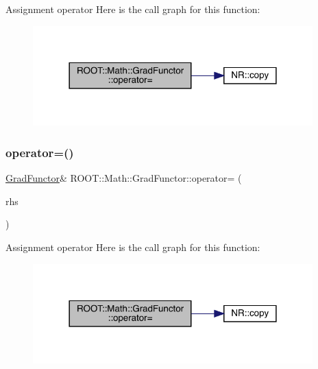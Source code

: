 Assignment operator Here is the call graph for this function\+:
\nopagebreak
\begin{figure}[H]
\begin{center}
\leavevmode
\includegraphics[width=306pt]{de/d74/classROOT_1_1Math_1_1GradFunctor_a7f7a0c6b466d283cb6085f0e57ab1e6a_cgraph}
\end{center}
\end{figure}
\mbox{\label{classROOT_1_1Math_1_1GradFunctor_a7f7a0c6b466d283cb6085f0e57ab1e6a}} 
\subsubsection{\texorpdfstring{operator=()}{operator=()}\hspace{0.1cm}{\footnotesize\ttfamily [2/3]}}
{\footnotesize\ttfamily \mbox{\hyperlink{classROOT_1_1Math_1_1GradFunctor}{Grad\+Functor}}\& R\+O\+O\+T\+::\+Math\+::\+Grad\+Functor\+::operator= (\begin{DoxyParamCaption}\item[{const \mbox{\hyperlink{classROOT_1_1Math_1_1GradFunctor}{Grad\+Functor}} \&}]{rhs }\end{DoxyParamCaption})\hspace{0.3cm}{\ttfamily [inline]}}

Assignment operator Here is the call graph for this function\+:
\nopagebreak
\begin{figure}[H]
\begin{center}
\leavevmode
\includegraphics[width=306pt]{de/d74/classROOT_1_1Math_1_1GradFunctor_a7f7a0c6b466d283cb6085f0e57ab1e6a_cgraph}
\end{center}
\end{figure}
\mbox{\label{classROOT_1_1Math_1_1GradFunctor_a7f7a0c6b466d283cb6085f0e57ab1e6a}} 
